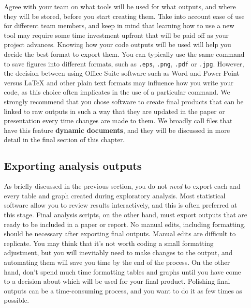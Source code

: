 
Agree with your team on what tools will be used for what outputs, 
and where they will be stored, before you start creating them.
Take into account ease of use for different team members, and
keep in mind that learning how to use a new tool may require some
time investment upfront that will be paid off as your project advances.
Knowing how your code outputs will be used will help you decide the best format to export them.
You can typically use the same command to save figures into different formats, 
such as \texttt{.eps}, \texttt{.png}, \texttt{.pdf} or \texttt{.jpg}.
However, the decision between using Office Suite software such as Word and Power Point
versus {\LaTeX} and other plain text formats may influence how you write your code,
as this choice often implicates in the use of a particular command.
We strongly recommend that you chose software to create final products
that can be linked to raw outputs in such a way that they are updated
in the paper or presentation every time changes are made to them.
We broadly call files that have this feature \textbf{dynamic documents},
and they will be discussed in more detail in the final section of this chapter.


\subsection{Exporting analysis outputs}

As briefly discussed in the previous section,
you do not \textit{need} to export each and every table and graph created during exploratory analysis.
Most statistical software allow you to review results interactively,
and this is often preferred at this stage.
Final analysis scripts, on the other hand, must export outputs
that are ready to be included in a paper or report.
No manual edits, including formatting, 
should be necessary after exporting final outputs.
Manual edits are difficult to replicate.
You may think that it's not worth coding a small formatting adjustment,
but you will inevitably need to make changes to the output,
and automating them will save you time by the end of the process.
On the other hand, don't spend much time formatting tables and graphs until 
you have come to a decision about which will be used for your final product.
Polishing final outputs can be a time-consuming process,
and you want to do it as few times as possible.

